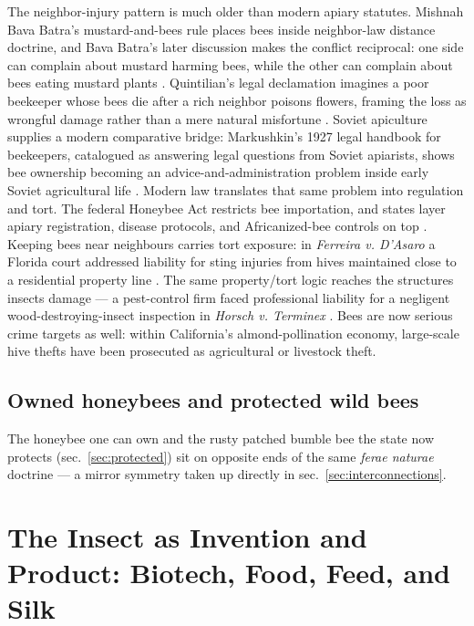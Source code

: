 \documentclass[
  english,
]{article}
\begin{document}
The neighbor-injury pattern is much older than modern apiary statutes.
Mishnah Bava Batra's mustard-and-bees rule places bees inside
neighbor-law distance doctrine, and Bava Batra's later discussion makes
the conflict reciprocal: one side can complain about mustard harming
bees, while the other can complain about bees eating mustard plants
\citep{mishnah_bava_batra2_10_bees, talmud_bava_batra18a_bees}.
Quintilian's legal declamation imagines a poor beekeeper whose bees die
after a rich neighbor poisons flowers, framing the loss as wrongful
damage rather than a mere natural misfortune
\citep{quintilian_decl13_bees}. Soviet apiculture supplies a modern
comparative bridge: Markushkin's 1927 legal handbook for beekeepers,
catalogued as answering legal questions from Soviet apiarists, shows bee
ownership becoming an advice-and-administration problem inside early
Soviet agricultural life
\citep{markushkin1927_beekeeper_legal_handbook}. Modern law translates
that same problem into regulation and tort. The federal Honeybee Act
restricts bee importation, and states layer apiary registration, disease
protocols, and Africanized-bee controls on top \citep{honeybee1922}.
Keeping bees near neighbours carries tort exposure: in \emph{Ferreira v.
D'Asaro} a Florida court addressed liability for sting injuries from
hives maintained close to a residential property line
\citep{ferreira1963}. The same property/tort logic reaches the
structures insects damage --- a pest-control firm faced professional
liability for a negligent wood-destroying-insect inspection in
\emph{Horsch v. Terminex} \citep{horsch1993}. Bees are now serious crime
targets as well: within California's almond-pollination economy,
large-scale hive thefts have been prosecuted as agricultural or
livestock theft.

\subsection{Owned honeybees and protected wild
bees}\label{owned-honeybees-and-protected-wild-bees}

The honeybee one can own and the rusty patched bumble bee the state now
protects (sec.~\ref{sec:protected}) sit on opposite ends of the same
\emph{ferae naturae} doctrine --- a mirror symmetry taken up directly in
sec.~\ref{sec:interconnections}.

\newpage

\section{The Insect as Invention and Product: Biotech, Food, Feed, and
Silk}\label{sec:invention}
\end{document}
